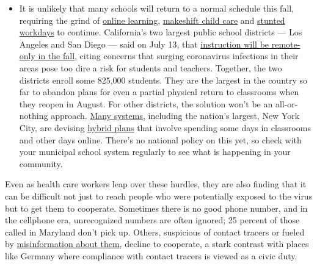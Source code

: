 \begin{itemize}
  \begin{itemize}
  \tightlist
  \item
    It is unlikely that many schools will return to a normal schedule
    this fall, requiring the grind of
    \href{https://www.nytimes.com/2020/06/05/us/coronavirus-education-lost-learning.html?action=click\&pgtype=Article\&state=default\&region=MAIN_CONTENT_3\&context=storylines_faq}{online
    learning},
    \href{https://www.nytimes.com/2020/05/29/us/coronavirus-child-care-centers.html?action=click\&pgtype=Article\&state=default\&region=MAIN_CONTENT_3\&context=storylines_faq}{makeshift
    child care} and
    \href{https://www.nytimes.com/2020/06/03/business/economy/coronavirus-working-women.html?action=click\&pgtype=Article\&state=default\&region=MAIN_CONTENT_3\&context=storylines_faq}{stunted
    workdays} to continue. California's two largest public school
    districts --- Los Angeles and San Diego --- said on July 13, that
    \href{https://www.nytimes.com/2020/07/13/us/lausd-san-diego-school-reopening.html?action=click\&pgtype=Article\&state=default\&region=MAIN_CONTENT_3\&context=storylines_faq}{instruction
    will be remote-only in the fall}, citing concerns that surging
    coronavirus infections in their areas pose too dire a risk for
    students and teachers. Together, the two districts enroll some
    825,000 students. They are the largest in the country so far to
    abandon plans for even a partial physical return to classrooms when
    they reopen in August. For other districts, the solution won't be an
    all-or-nothing approach.
    \href{https://bioethics.jhu.edu/research-and-outreach/projects/eschool-initiative/school-policy-tracker/}{Many
    systems}, including the nation's largest, New York City, are
    devising
    \href{https://www.nytimes.com/2020/06/26/us/coronavirus-schools-reopen-fall.html?action=click\&pgtype=Article\&state=default\&region=MAIN_CONTENT_3\&context=storylines_faq}{hybrid
    plans} that involve spending some days in classrooms and other days
    online. There's no national policy on this yet, so check with your
    municipal school system regularly to see what is happening in your
    community.
  \end{itemize}
\end{itemize}

Even as health care workers leap over these hurdles, they are also
finding that it can be difficult not just to reach people who were
potentially exposed to the virus but to get them to cooperate. Sometimes
there is no good phone number, and in the cellphone era, unrecognized
numbers are often ignored; 25 percent of those called in Maryland don't
pick up. Others, suspicious of contact tracers or fueled by
\href{https://www.npr.org/sections/health-shots/2020/07/14/890628203/conspiracy-theories-aside-heres-what-contact-tracers-really-do}{misinformation
about them}, decline to cooperate, a stark contrast with places like
Germany where compliance with contact tracers is viewed as a civic duty.

